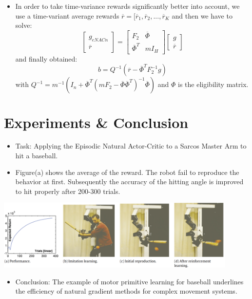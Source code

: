 {\begin{pcolumn}
{\begin{itemize}
	\item In order to take time-variance rewards significantly better into account, we use a time-variant average rewards $\overline r = [\overline r_1, \overline r_2, ..., \overline r_K$ and then we have to solve:  \vspace{-2mm}
\begin{equation}
\left[
	\begin{matrix}
		g_{eNACn} \\
		\overline r
	\end{matrix}
	\right] = 
\left[
	\begin{matrix}
		F_2 & \overline \Phi \\
		\overline \Phi^T & mI_H
	\end{matrix}
	\right]
\left[
	\begin{matrix}
		g \\
		\overline r
	\end{matrix}
	\right]
\end{equation}
and finally obtained:
\begin{equation}
	b = Q^{-1}(\overline r - \overline \Phi^T F_2^{-1}g)
\end{equation}
with $Q^{-1} = m^{-1}(I_n + \overline\Phi^T(mF_2-\overline\Phi\overline\Phi^T)^{-1}\overline\Phi)$ and $\Phi$ is the eligibility matrix. 
\end{itemize}
\vspace*{-2mm}
}

\section{Experiments \& Conclusion}
\begin{itemize}
	\item Task: Applying the Episodic Natural Actor-Critic to a Sarcos Master Arm to hit a baseball.
	\item Figure(a) shows the average of the reward. The robot fail to reproduce the behavior at first. Subsequently the accuracy of the hitting angle is improved to hit properly after 200-300 trials.
\end{itemize}
\begin{center}
	\includegraphics[width=0.9\textwidth]{img/performance1.png}
	\vspace*{-13mm}
\end{center}
\begin{itemize}
	\item Conclusion: The example of motor primitive learning for baseball underlines the efficiency of natural gradient methods for complex movement systems.
\end{itemize}


\end{pcolumn}
}



\makeposter

